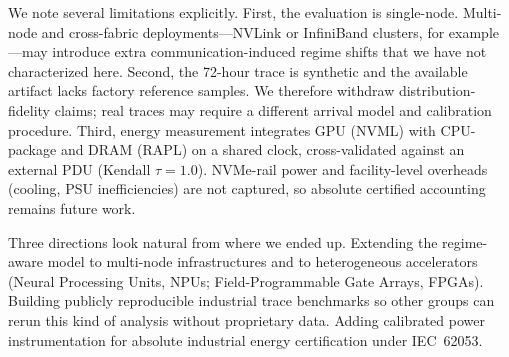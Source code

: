 We note several limitations explicitly.
First, the evaluation is single-node. Multi-node and cross-fabric deployments---NVLink or InfiniBand clusters, for example---may introduce extra communication-induced regime shifts that we have not characterized here.
Second, the 72-hour trace is synthetic and the available artifact lacks factory reference samples. We therefore withdraw distribution-fidelity claims; real traces may require a different arrival model and calibration procedure.
Third, energy measurement integrates GPU (NVML) with CPU-package and DRAM (RAPL) on a shared clock, cross-validated against an external PDU (Kendall $\tau=1.0$). NVMe-rail power and facility-level overheads (cooling, PSU inefficiencies) are not captured, so absolute certified accounting remains future work.

Three directions look natural from where we ended up.
Extending the regime-aware model to multi-node infrastructures and to heterogeneous accelerators (Neural Processing Units, NPUs; Field-Programmable Gate Arrays, FPGAs).
Building publicly reproducible industrial trace benchmarks so other groups can rerun this kind of analysis without proprietary data.
Adding calibrated power instrumentation for absolute industrial energy certification under IEC~62053.
